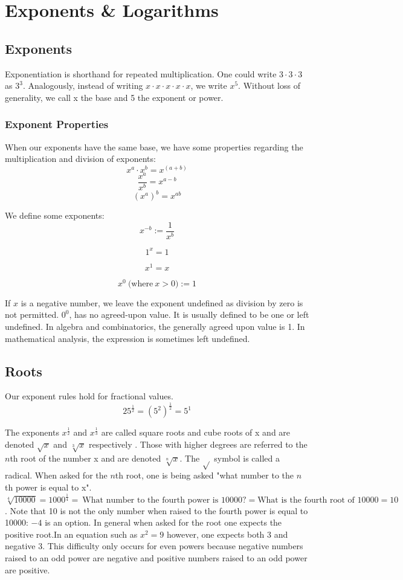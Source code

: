 \chapter{Exponents \& Logarithms}

\section*{Exponents}

Exponentiation is shorthand for repeated multiplication. One could write $3 \cdot 3 \cdot 3$ as $3^3$. Analogously, instead of writing $x \cdot x \cdot x \cdot x \cdot x$, we write $x^5$. Without loss of generality, we call x the base and 5 the exponent or power.

\subsection*{Exponent Properties}

When our exponents have the same base, we have some properties regarding the multiplication and division of exponents: $$ x^a \cdot x^b = x^{(a+b)}$$ $$ \frac{x^a}{x^b} = x^{a-b}$$ $$ (x^a)^b = x^{ab}$$

We define some exponents:
$$ x^{-b} := \frac{1}{x^b} $$

$$ 1^x = 1$$

$$ x^1 = x $$

$$ x^0 \ \text{(where} \ x > 0) := 1$$

If $x$ is a negative number, we leave the exponent undefined as division by zero is not permitted. $0^0$, has no agreed-upon value. It is usually defined to be one or left undefined. In algebra and combinatorics, the generally agreed upon value is 1. In mathematical analysis, the expression is sometimes left undefined.

\section*{Roots}

Our exponent rules hold for fractional values. $$ 25^{\frac{1}{2}} = (5^2)^{\frac{1}{2}} = 5^1$$

The exponents $x^{\frac{1}{2}}$ and $x^{\frac{1}{3}}$ are called square roots and cube roots of x and are denoted $\sqrt{x}$ and $\sqrt[3]{x}$ respectively . Those with higher degrees are referred to the $n$th root of the number x and are denoted $\sqrt[n]{x}$. The $\sqrt{}$ symbol is called a radical. When asked for the $n$th root, one is being asked "what number to the $n$th power is equal to x". $ \sqrt[4]{10000} = 1000^{\frac{1}{4}} = \ \text{What number to the fourth power is 10000?} = \text{What is the fourth root of 10000} = 10$. Note that 10 is not the only number when raised to the fourth power is equal to 10000: $-4$ is an option. In general when asked for the root one expects the positive root.In an equation such as $x^2 = 9$ however, one expects both 3 and negative 3. This difficulty only occurs for even powers because negative numbers raised to an odd power are negative and positive numbers raised to an odd power are positive.

